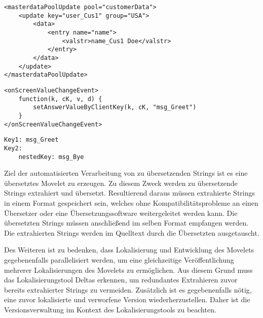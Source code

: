 \begin{lstlisting}[caption={MXML-Elemente und -Attribut inklusive Stammdaten}, label={lst:md}]
<masterdataPoolUpdate pool="customerData">
	<update key="user_Cus1" group="USA">
		<data>
			<entry name="name">
				<valstr>name_Cus1 Doe</valstr>
			</entry>
		</data>
	</update>
</masterdataPoolUpdate>
\end{lstlisting}
\begin{lstlisting}[caption={MEL-Stringliterale}, label={lst:mel}]
<onScreenValueChangeEvent>
	function(k, cK, v, d) {
		setAnswerValueByClientKey(k, cK, "msg_Greet")
	}
</onScreenValueChangeEvent>
\end{lstlisting}
\begin{lstlisting}[caption={Werte in Movilizer Gradle Plug"~in Ressource Dateien}, label={lst:rscfile}]
Key1: msg_Greet
Key2:
	nestedKey: msg_Bye
\end{lstlisting}
Ziel der automatisierten Verarbeitung von zu übersetzenden Strings ist es eine übersetztes Movelet zu erzeugen. Zu diesem Zweck werden zu übersetzende Strings extrahiert und übersetzt. Resultierend daraus müssen extrahierte Strings in einem Format gespeichert sein, welches ohne Kompatibilitätsprobleme an einen Übersetzer oder eine Übersetzungssoftware weitergeleitet werden kann. Die übersetzten Strings müssen anschließend im selben Format empfangen werden. Die extrahierten Strings werden im Quelltext durch die Übersetzten ausgetauscht. 
\par
Des Weiteren ist zu bedenken, dass Lokalisierung und Entwicklung des Movelets gegebenenfalls parallelisiert werden, um eine gleichzeitige Veröffentlichung mehrerer Lokalisierungen des Movelets zu ermöglichen. Aus diesem Grund muss das Lokalisierungstool Deltas erkennen, um redundantes Extrahieren zuvor bereits extrahierter Strings zu vermeiden. Zusätzlich ist es gegebenenfalls nötig, eine zuvor lokalisierte und verworfene Version wiederherzustellen. Daher ist die Versionsverwaltung im Kontext des Lokalisierungstools zu beachten.